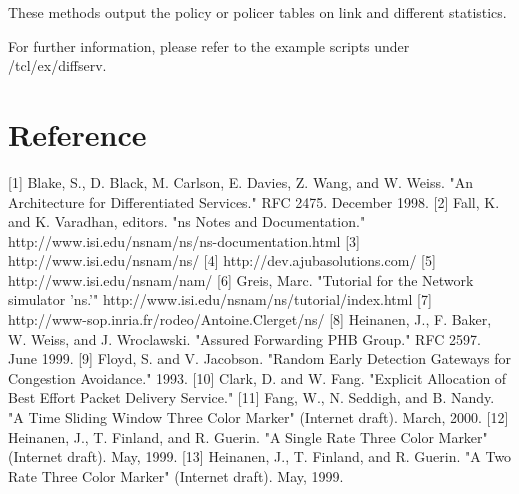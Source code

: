 These methods output the policy or policer tables on link and different statistics.  

For further information, please refer to the example scripts under \ns/tcl/ex/diffserv.

\section{Reference}
\label{sec:diffservref}

\label{1}[1] Blake, S., D. Black, M. Carlson, E. Davies, Z. Wang, and W. Weiss.  "An Architecture for Differentiated Services."  RFC 2475.  December 1998.
\label{2}[2] Fall, K. and K. Varadhan, editors.  "ns Notes and Documentation."                    http://www.isi.edu/nsnam/ns/ns-documentation.html
\label{3}[3] http://www.isi.edu/nsnam/ns/
\label{4}[4] http://dev.ajubasolutions.com/
\label{5}[5] http://www.isi.edu/nsnam/nam/
\label{6}[6] Greis, Marc.  "Tutorial for the Network simulator 'ns.'" 
http://www.isi.edu/nsnam/ns/tutorial/index.html
\label{7}[7] http://www-sop.inria.fr/rodeo/Antoine.Clerget/ns/
\label{8}[8] Heinanen, J., F. Baker, W. Weiss, and J. Wroclawski.  "Assured Forwarding PHB Group."  RFC 2597.  June 1999.
\label{9}[9] Floyd, S. and V. Jacobson.  "Random Early Detection Gateways for Congestion Avoidance."  1993.
\label{10}[10] Clark, D. and W. Fang.  "Explicit Allocation of Best Effort Packet Delivery Service."  
\label{11}[11] Fang, W., N. Seddigh, and B. Nandy.  "A Time Sliding Window Three Color Marker" (Internet draft).  March, 2000.
\label{12}[12] Heinanen, J., T. Finland, and R. Guerin.  "A Single Rate Three Color Marker" (Internet draft).  May, 1999.
\label{13}[13] Heinanen, J., T. Finland, and R. Guerin.  "A Two Rate Three Color Marker" (Internet draft).  May, 1999.
